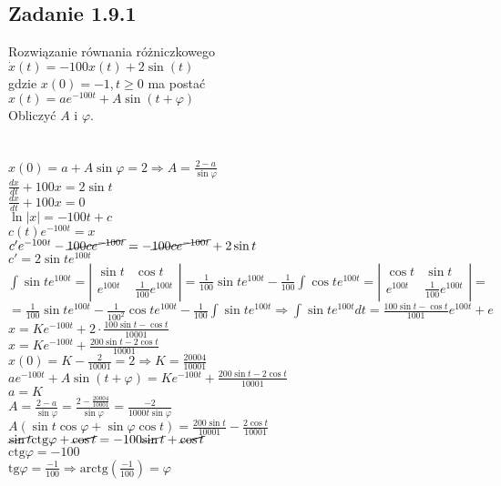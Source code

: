 \subsection*{Zadanie 1.9.1} {\color{darkgray}
	Rozwiązanie równania różniczkowego\\
	$\dot{x}(t)=-100x(t)+2\sin(t)$\\
	gdzie $x(0)=-1, t\geqslant 0$ ma postać\\
	$x(t)=ae^{-100t}+A\sin(t+\varphi)$\\
	Obliczyć $A$ i $\varphi$.\\
}\lineh
\\\\
$x(0)=a+A\sin \varphi =2 \Rightarrow \boxed{A=\frac{2-a}{\sin \varphi}}$\\
$\frac{dx}{dt}+100x=2\sin t$\\
$\frac{dx}{dt}+100x=0$\\
$\ln|x|=-100t+c$\\
$c(t)e^{-100t}=x$\\
$c'e^{-100t}-\cancel{100ce^{-100t}}=-\cancel{100ce^{-100t}}+2\sin t$\\
$c'=2\sin t e^{100t}$\\
$\int \sin t e^{100t}=\left|\begin{array}{cc}\sin t & \cos t \\ e^{100t} & \frac{1}{100}e^{100t}\end{array}\right|=\frac{1}{100}\sin t e^{100t}-\frac{1}{100} \int \cos t e^{100t}=\left|\begin{array}{cc}\cos t & \sin t \\ e^{100t} & \frac{1}{100}e^{100t}\end{array}\right|=$\\
$=\frac{1}{100}\sin t e^{100t}-\frac{1}{100^2}\cos t e^{100t}-\frac{1}{100} \int \sin t e^{100t} \Rightarrow \int \sin t e^{100t} dt = \boxed{\frac{100\sin t - \cos t}{1001}e^{100t}+e}$\\
$\boxed{x=Ke^{-100t}+2\cdot\frac{100\sin t - \cos t}{10001}}$\\
$x=Ke^{-100t}+\frac{200\sin t -2\cos t}{10001}$\\
$x(0)=K-\frac{2}{10001}=2 \Rightarrow K=\frac{20004}{10001}$\\
$ae^{-100t}+A\sin(t+\varphi)=Ke^{-100t}+\frac{200\sin t - 2 \cos t}{10001}$\\
$a=K$\\
$A=\frac{2-a}{\sin \varphi}=\frac{2-\frac{20004}{10001}}{\sin \varphi}=\frac{-2}{1000t\sin\varphi}$\\
$A(\sin t \cos \varphi + \sin \varphi \cos t)=\frac{200\sin t}{10001}-\frac{2\cos t}{10001}$\\
$\cancel{\sin t}\text{ctg}\varphi+\cancel{\cos t}=-100\cancel{\sin t}+\cancel{\cos t}$\\
$\text{ctg}\varphi= -100$\\
$\text{tg}\varphi=\frac{-1}{100} \Rightarrow \boxed{\text{arctg}(\frac{-1}{100})=\varphi}$\\


